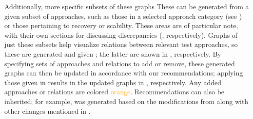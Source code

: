     Additionally, more specific subsets of these graphs \else These \fi
can be generated from a given subset of approaches, such as
\ifnotpaper\else those in a selected approach category (see
    ) or \fi those pertaining to recovery or
scability\ifnotpaper. These areas are of particular note, with their own
sections for discussing discrepancies (,
respectively). Graphs of just these subsets help visualize relations
between relevant test approaches, so these are generated and given
\else; the latter are shown \fi in , respectively. By specifying sets of approaches
and relations to add or remove,
these generated graphs can then be updated in accordance with our
recommendations; applying those given in  results in the updated graphs in
, respectively. Any added approaches or relations are
colored \textcolor{orange}{orange}.
\ifnotpaper
    Recommendations can also be inherited; for example,
     was generated based on the modifications from
     along with
    other changes mentioned in .
\fi

\ifnotpaper
    
\else
    \sntxDiscrepsTable{}
    \smntcDiscrepsTable{}
\fi
